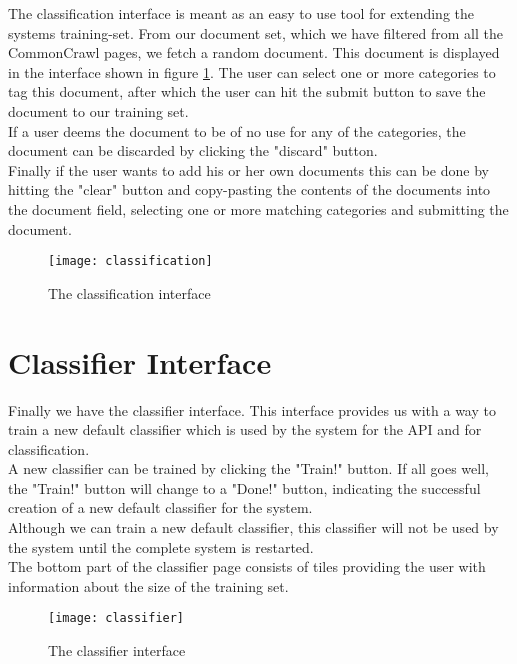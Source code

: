 The classification interface is meant as an easy to use tool for extending the systems training-set. From our document set, which we have filtered from all the CommonCrawl pages, we fetch a random document. This document is displayed in the interface shown in figure \ref{fig:classification}. The user can select one or more categories to tag this document, after which the user can hit the submit button to save the document to our training set.\\
If a user deems the document to be of no use for any of the categories, the document can be discarded by clicking the "discard" button.\\
Finally if the user wants to add his or her own documents this can be done by hitting the "clear" button and copy-pasting the contents of the documents into the document field, selecting one or more matching categories and submitting the document.

\begin{figure}[H]
    \centering
    \texttt{[image: classification]}
    \caption{The classification interface}
    \label{fig:classification}
\end{figure}

\section{Classifier Interface}

Finally we have the classifier interface. This interface provides us with a way to train a new default classifier which is used by the system for the API and for classification.\\
A new classifier can be trained by clicking the "Train!" button. If all goes well, the "Train!" button will change to a "Done!" button, indicating the successful creation of a new default classifier for the system.\\ 
Although we can train a new default classifier, this classifier will not be used by the system until the complete system is restarted.\\
The bottom part of the classifier page consists of tiles providing the user with information about the size of the training set.

\begin{figure}[H]
    \centering
    \texttt{[image: classifier]}
    \caption{The classifier interface}
    \label{fig:classifier}
\end{figure}
